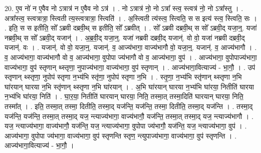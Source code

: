 \documentclass[17pt]{extarticle}
\begin{document}
20. ए॒व नो॑ न ए॒वैव नो ऽत्रात्र॑ न ए॒वैव नो ऽत्र॑ । . नो ऽत्रात्र॑ नो॒ नो ऽत्रा᳚ स्त्व॒ स्त्वत्र॑ नो॒ नो ऽत्रा᳚स्तु । . अत्रा᳚स्त्व॒ स्त्वत्रात्रा॒ स्त्विती त्य॒स्त्वत्रात्रा॒ स्त्विति॑ । . अ॒स्त्विती त्य॑स्त्व॒ स्त्विति॒ स स इत्य॑ स्त्व॒ स्त्विति॒ सः । . इति॒ स स इतीति॒ सो᳚ ऽब्रवी दब्रवी॒थ् स इतीति॒ सो᳚ ऽब्रवीत् । . सो᳚ ऽब्रवी दब्रवी॒थ् स सो᳚ ऽब्रवी॒द् यजा॒न्॒. यजा॑ नब्रवी॒थ् स सो᳚ ऽब्रवी॒द् यजान्॑ । . अ॒ब्र॒वी॒द् यजा॒न्॒. यजा॑ नब्रवी दब्रवी॒द् यजान्॑. वो वो॒ यजा॑ नब्रवी दब्रवी॒द् यजान्॑. वः । . यजान्॑. वो वो॒ यजा॒न्॒. यजान्॑. व॒ आज्य॑भागा॒ वाज्य॑भागौ वो॒ यजा॒न्॒. यजान्॑. व॒ आज्य॑भागौ । . व॒ आज्य॑भागा॒ वाज्य॑भागौ वो व॒ आज्य॑भागा॒ वुपोपा ज्य॑भागौ वो व॒ आज्य॑भागा॒ वुप॑ । . आज्य॑भागा॒ वुपोपाज्य॑भागा॒ वाज्य॑भागा॒ वुप॑ स्तृणान् थ्स्तृणा॒ नुपाज्य॑भागा॒ वाज्य॑भागा॒ वुप॑ स्तृणान् । . आज्य॑भागा॒वित्याज्य॑ - भा॒गौ॒ । . उप॑ स्तृणान् थ्स्तृणा॒ नुपोप॑ स्तृणा न॒भ्य॑भि स्तृ॑णा॒ नुपोप॑ स्तृणा न॒भि । . स्तृ॒णा॒ न॒भ्य॑भि स्तृ॑णान् थ्स्तृणा न॒भि घा॑रयान् घारया न॒भि स्तृ॑णान् थ्स्तृणा न॒भि घा॑रयान् । . अ॒भि घा॑रयान् घारया न॒भ्य॑भि घा॑रया॒ नितीति॑ घारया न॒भ्य॑भि घा॑रया॒ निति॑ । . घा॒र॒या॒ नितीति॑ घारयान् घारया॒ निति॒ तस्मा॒त् तस्मा॒दिति॑ घारयान् घारया॒ निति॒ तस्मा᳚त् । . इति॒ तस्मा॒त् तस्मा॒ दितीति॒ तस्मा॒द् यज॑न्ति॒ यज॑न्ति॒ तस्मा॒ दितीति॒ तस्मा॒द् यज॑न्ति । . तस्मा॒द् यज॑न्ति॒ यज॑न्ति॒ तस्मा॒त् तस्मा॒द् यज॒ न्त्याज्य॑भागा॒ वाज्य॑भागौ॒ यज॑न्ति॒ तस्मा॒त् तस्मा॒द् यज॒ न्त्याज्य॑भागौ । . यज॒ न्त्याज्य॑भागा॒ वाज्य॑भागौ॒ यज॑न्ति॒ यज॒ न्त्याज्य॑भागा॒ वुपोपा ज्य॑भागौ॒ यज॑न्ति॒ यज॒ न्त्याज्य॑भागा॒ वुप॑ । . आज्य॑भागा॒ वुपोपा ज्य॑भागा॒ वाज्य॑भागा॒ वुप॑ स्तृणन्ति स्तृण॒ न्त्युपाज्य॑भागा॒ वाज्य॑भागा॒ वुप॑ स्तृणन्ति । . आज्य॑भागा॒वित्याज्य॑ - भा॒गौ॒ । \newline
\end{document}
